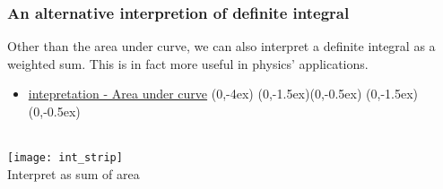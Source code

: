 \documentclass[class=article, crop=false, 12pt]{standalone}
\begin{document}


\subsubsection{An alternative interpretion of definite integral}

Other than the area under curve, we can also interpret a definite integral as a weighted sum. This is in fact more useful in physics' applications.

\begin{minipage}{0.7\textwidth}
    \begin{itemize}
        \item \ul{ intepretation - Area under curve}
            {(0,-4ex)}
            {(0,-1.5ex)}{(0,-0.5ex)}
            {(0,-1.5ex)}{(0,-0.5ex)}
        \\
    \end{itemize}
\end{minipage}
\begin{minipage}{0.3\textwidth}
    \hfill \\[1.5em]
    \centering
    \texttt{[image: int\_strip]}
    \\
    \scriptsize \hspace{5ex} Interpret as sum of area 
\end{minipage}
\end{document}
